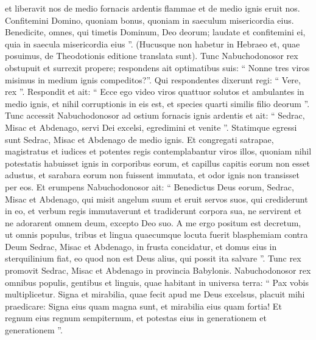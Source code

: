 \begin{biblechapter}
\begin{biblechapter}
\begin{biblechapter}
 et liberavit nos de medio fornacis ardentis flammae
 et de medio ignis eruit nos.
 \verse Confitemini Domino, quoniam bonus,
 quoniam in saeculum misericordia eius.
 \verse Benedicite, omnes, qui timetis Dominum, Deo deorum;
 laudate et confitemini ei, quia in saecula misericordia eius ”.
 (Hucusque non habetur in Hebraeo et, quae posuimus, de Theodotionis editione translata sunt).
 \verse \verse Tunc Nabuchodonosor rex obstupuit et surrexit propere; respondens ait optimatibus suis: “ Nonne tres viros misimus in medium ignis compeditos?”. Qui respondentes dixerunt regi: “ Vere, rex ”. 
\verse \verse Respondit et ait: “ Ecce ego video viros quattuor solutos et ambulantes in medio ignis, et nihil corruptionis in eis est, et species quarti similis filio deorum ”. 
\verse \verse Tunc accessit Nabuchodonosor ad ostium fornacis ignis ardentis et ait: “ Sedrac, Misac et Abdenago, servi Dei excelsi, egredimini et venite ”. Statimque egressi sunt Sedrac, Misac et Abdenago de medio ignis. 
\verse \verse Et congregati satrapae, magistratus et iudices et potentes regis contemplabantur viros illos, quoniam nihil potestatis habuisset ignis in corporibus eorum, et capillus capitis eorum non esset adustus, et sarabara eorum non fuissent immutata, et odor ignis non transisset per eos. 
\verse \verse Et erumpens Nabuchodonosor ait: “ Benedictus Deus eorum, Sedrac, Misac et Abdenago, qui misit angelum suum et eruit servos suos, qui crediderunt in eo, et verbum regis immutaverunt et tradiderunt corpora sua, ne servirent et ne adorarent omnem deum, excepto Deo suo. 
\verse \verse A me ergo positum est decretum, ut omnis populus, tribus et lingua quaecumque locuta fuerit blasphemiam contra Deum Sedrac, Misac et Abdenago, in frusta concidatur, et domus eius in sterquilinium fiat, eo quod non est Deus alius, qui possit ita salvare ”. 
\verse \verse Tunc rex promovit Sedrac, Misac et Abdenago in provincia Babylonis.
 \verse \verse Nabuchodonosor rex omnibus populis, gentibus et linguis, quae habitant in universa terra: “ Pax vobis multiplicetur. 
\verse \verse Signa et mirabilia, quae fecit apud me Deus excelsus, placuit mihi praedicare:
 \verse \verse Signa eius quam magna sunt,
 et mirabilia eius quam fortia!
 Et regnum eius regnum sempiternum,
 et potestas eius in generationem et generationem ”.
 

\end{biblechapter}
\end{biblechapter}
\end{biblechapter}

